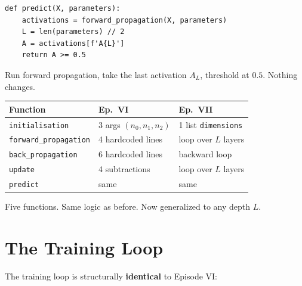 \documentclass[11pt]{article}
\begin{document}
\begin{lstlisting}
def predict(X, parameters):
    activations = forward_propagation(X, parameters)
    L = len(parameters) // 2
    A = activations[f'A{L}']
    return A >= 0.5
\end{lstlisting}

Run forward propagation, take the last activation $A_L$, threshold at $0.5$. Nothing changes.

\vspace{1em}

\begin{recapbox}[title=Checkpoint --- Your Generalized Toolkit]
\centering
\begin{tabular}{l l l}
\textbf{Function} & \textbf{Ep.~VI} & \textbf{Ep.~VII} \\
\hline
\texttt{initialisation} & 3 args $(n_0, n_1, n_2)$ & 1 list \texttt{dimensions} \\
\texttt{forward\_propagation} & 4 hardcoded lines & loop over $L$ layers \\
\texttt{back\_propagation} & 6 hardcoded lines & backward loop \\
\texttt{update} & 4 subtractions & loop over $L$ layers \\
\texttt{predict} & same & same \\
\end{tabular}

\vspace{0.5em}
Five functions. Same logic as before. Now generalized to any depth $L$.
\end{recapbox}


\section{The Training Loop}

The training loop is structurally \textbf{identical} to Episode VI:
\end{document}
